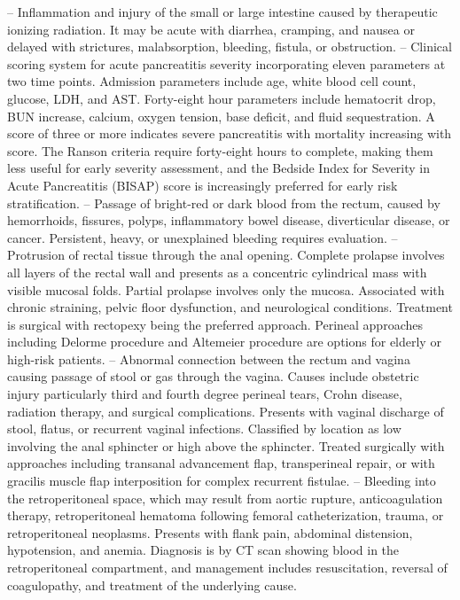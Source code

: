 -- Inflammation and injury of the small or large intestine caused by therapeutic ionizing radiation. It may be acute with diarrhea, cramping, and nausea or delayed with strictures, malabsorption, bleeding, fistula, or obstruction.
-- Clinical scoring system for acute pancreatitis severity incorporating eleven parameters at two time points. Admission parameters include age, white blood cell count, glucose, LDH, and AST. Forty-eight hour parameters include hematocrit drop, BUN increase, calcium, oxygen tension, base deficit, and fluid sequestration. A score of three or more indicates severe pancreatitis with mortality increasing with score. The Ranson criteria require forty-eight hours to complete, making them less useful for early severity assessment, and the Bedside Index for Severity in Acute Pancreatitis (BISAP) score is increasingly preferred for early risk stratification.
-- Passage of bright-red or dark blood from the rectum, caused by hemorrhoids, fissures, polyps, inflammatory bowel disease, diverticular disease, or cancer. Persistent, heavy, or unexplained bleeding requires evaluation.
-- Protrusion of rectal tissue through the anal opening. Complete prolapse involves all layers of the rectal wall and presents as a concentric cylindrical mass with visible mucosal folds. Partial prolapse involves only the mucosa. Associated with chronic straining, pelvic floor dysfunction, and neurological conditions. Treatment is surgical with rectopexy being the preferred approach. Perineal approaches including Delorme procedure and Altemeier procedure are options for elderly or high-risk patients.
-- Abnormal connection between the rectum and vagina causing passage of stool or gas through the vagina. Causes include obstetric injury particularly third and fourth degree perineal tears, Crohn disease, radiation therapy, and surgical complications. Presents with vaginal discharge of stool, flatus, or recurrent vaginal infections. Classified by location as low involving the anal sphincter or high above the sphincter. Treated surgically with approaches including transanal advancement flap, transperineal repair, or with gracilis muscle flap interposition for complex recurrent fistulae.
-- Bleeding into the retroperitoneal space, which may result from aortic rupture, anticoagulation therapy, retroperitoneal hematoma following femoral catheterization, trauma, or retroperitoneal neoplasms. Presents with flank pain, abdominal distension, hypotension, and anemia. Diagnosis is by CT scan showing blood in the retroperitoneal compartment, and management includes resuscitation, reversal of coagulopathy, and treatment of the underlying cause.
